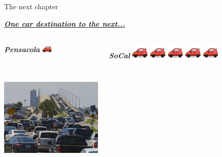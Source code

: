 \documentclass[serif]{beamer}\usepackage[]{graphicx}\usepackage[]{color}
\newcommand{\emtxt}[1]{\textbf{\textit{#1}}}
\begin{document}
\begin{frame}{The next chapter}{}
{\Large \centerline{\underline{\emtxt{One car destination to the next...}}}}
\vspace{0.2in}
\begin{columns}[t]
\begin{column}{0.5\textwidth}
\centerline{\emtxt{Pensacola} \includegraphics[width = 0.1\textwidth]{fig/car.png}} \\~\\
\includegraphics[width = \textwidth]{fig/pbtraffic.jpg}
\end{column}
\begin{column}{0.5\textwidth}
\centerline{\emtxt{SoCal} \includegraphics[width = 0.1\textwidth]{fig/car.png} \includegraphics[width = 0.1\textwidth]{fig/car.png} \includegraphics[width = 0.1\textwidth]{fig/car.png} \includegraphics[width = 0.1\textwidth]{fig/car.png} \includegraphics[width = 0.1\textwidth]{fig/car.png}} \\~\\

\end{column}
\end{columns}
\end{frame}
\end{document}
